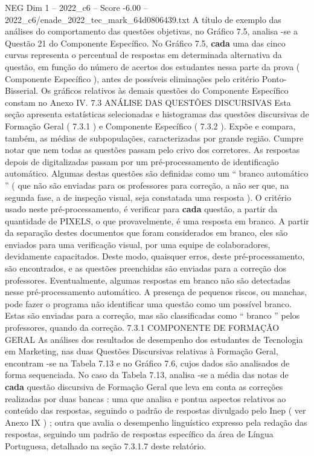 \begin{textsample}{NEG Dim 1 – 2022\_c6 – Score -6.00 – 2022\_c6/enade\_2022\_tec\_mark\_64d0806439.txt}
A título de exemplo das análises do comportamento das questões objetivas, no Gráfico 7.5, analisa -se a Questão 21 do Componente Específico.
No Gráfico 7.5, \textbf{cada} uma das cinco curvas representa o percentual de respostas em determinada alternativa da questão, em função do número de acertos dos estudantes nessa parte da prova ( Componente Específico ), antes de possíveis eliminações pelo critério Ponto-Bisserial.
Os gráficos relativos às demais questões do Componente Específico constam no Anexo IV. 7.3 ANÁLISE DAS QUESTÕES DISCURSIVAS Esta seção apresenta estatísticas selecionadas e histogramas das questões discursivas de Formação Geral ( 7.3.1 ) e Componente Específico ( 7.3.2 ).
Expõe e compara, também, as médias de subpopulações, caracterizadas por grande região.
Cumpre notar que nem todas as questões passam pelo crivo dos corretores.
As respostas depois de digitalizadas passam por um pré-processamento de identificação automático.
Algumas destas questões são definidas como um “ branco automático ” ( que não são enviadas para os professores para correção, a não ser que, na segunda fase, a de inspeção visual, seja constatada uma resposta ).
O critério usado neste pré-processamento, é verificar para \textbf{cada} questão, a partir da quantidade de PIXELS, o que provavelmente, é uma resposta em branco.
A partir da separação destes documentos que foram considerados em branco, eles são enviados para uma verificação visual, por uma equipe de colaboradores, devidamente capacitados.
Deste modo, quaisquer erros, deste pré-processamento, são encontrados, e as questões preenchidas são enviadas para a correção dos professores.
Eventualmente, algumas respostas em branco não são detectadas nesse pré-processamento automático.
A presença de pequenos riscos, ou manchas, pode fazer o programa não identificar uma questão como um possível branco.
Estas são enviadas para a correção, mas são classificadas como “ branco ” pelos professores, quando da correção. 7.3.1 COMPONENTE DE FORMAÇÃO GERAL As análises dos resultados de desempenho dos estudantes de Tecnologia em Marketing, nas duas Questões Discursivas relativas à Formação Geral, encontram -se na Tabela 7.13 e no Gráfico 7.6, cujos dados são analisados de forma sequenciada.
No caso da Tabela 7.13, analisa -se a média das notas de \textbf{cada} questão discursiva de Formação Geral que leva em conta as correções realizadas por duas bancas : uma que analisa e pontua aspectos relativos ao conteúdo das respostas, seguindo o padrão de respostas divulgado pelo Inep ( ver Anexo IX ) ; outra que avalia o desempenho linguístico expresso pela redação das respostas, seguindo um padrão de respostas específico da área de Língua Portuguesa, detalhado na seção 7.3.1.7 deste relatório.

\end{textsample}
